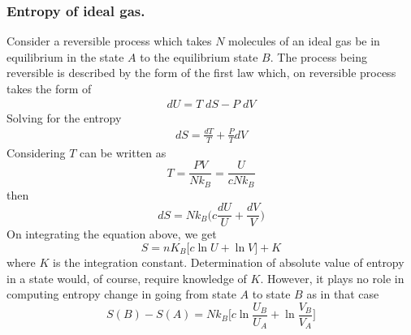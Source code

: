 \documentclass[../../../Main.tex]{subfiles}
\begin{document}
\subsubsection{Entropy of ideal gas.} Consider a reversible process which takes $N$ molecules of an ideal gas be in equilibrium in the state $A$ to the equilibrium state $B$. The process being reversible is described by the form of the first law which, on reversible process takes the form of 
\begin{eqnarray}
    dU=T\;dS-P\;dV
\end{eqnarray}
Solving for the entropy
\begin{eqnarray}
    dS=\frac{dT}{T}+\frac{P}{T}dV
\end{eqnarray}
Considering $T$ can be written as
\begin{equation*}
    T=\frac{PV}{Nk_B}=\frac{U}{cNk_B}
\end{equation*}
then 
\begin{equation*}
    dS=Nk_B\biggl(c\frac{dU}{U}+\frac{dV}{V}\biggr)
\end{equation*}
On integrating the equation above, we get
\begin{equation*}
    S=nK_B\bigl[c\ln U+\ln V\bigr]+K
\end{equation*}
where $K$ is the integration constant. Determination of absolute value of entropy in a state would, of course, require knowledge of $K$. However, it plays no role in computing entropy change in going from state $A$ to state $B$ as in that case
\begin{equation*}
    S(B)-S(A)=Nk_B \biggl[c\ln\frac{U_B}{U_A}+\ln\frac{V_B}{V_A}\biggr]
\end{equation*}
\end{document}
